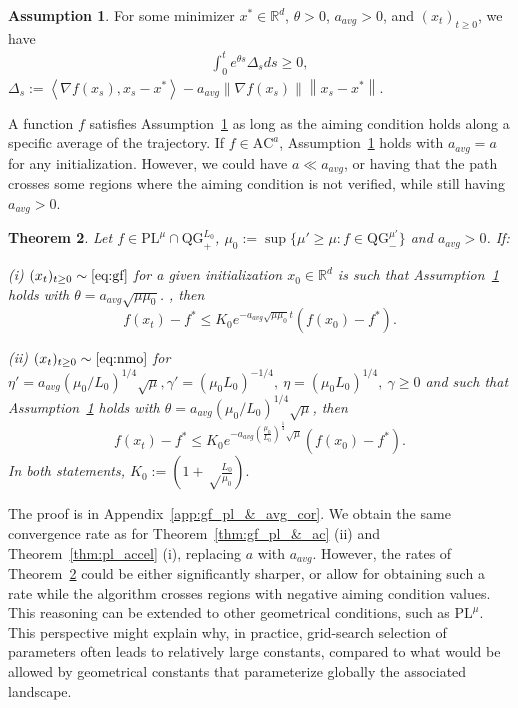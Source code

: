 \documentclass{article}
\newcommand{\jh}[1]{{\color{red} #1}}
\def\R{{\mathbb{R}}}
\def\xcont{(x_t)_{t\ge 0}}
\def\pl{{\text{PL}^\mu}}
\newcommand{\bpar}[1]{\left(#1\right)}
\newcommand{\norm}[1]{\left\lVert#1\right\rVert}
\newcommand{\dotprod}[1]{\left< #1\right>}
\newcommand{\ac}{\text{AC}^{a}}
\newcommand{\qg}{\text{QG}_{+}^{L_0}}
\newcommand{\qginff}[1]{\text{QG}_{-}^{#1}}
\theoremstyle{plain}
\newtheorem{theorem}{Theorem}[section]
\theoremstyle{definition}
\newtheorem{assumption}[theorem]{Assumption}
\theoremstyle{remark}
\begin{document}
\begin{assumption}\label{ass:avg_corelation}
    For some minimizer $x^\ast \in \R^d$, $\theta > 0$, $a_{avg} > 0$, and $\xcont$, we have
    \begin{align*}
        \int_0^t e^{\theta s}\Delta_sds
        \ge 0,
    \end{align*}
   $\Delta_s :=\dotprod{\nabla f(x_s),x_s-x^\ast}-a_{avg}\norm{\nabla f(x_s)}\norm{x_s-x^\ast}$.
\end{assumption}
A function $f$ satisfies Assumption~\ref{ass:avg_corelation} as long as the aiming condition holds along a specific average of the trajectory.
If $f \in \ac$, Assumption~\ref{ass:avg_corelation} holds with $a_{avg} = a$ for any %
initialization. However, we could have $a \ll a_{avg}$, or having that the path crosses some regions where the aiming condition is not verified, while still having $a_{avg} > 0$. %
\begin{theorem}\label{thm:gf_pl_&_avg_cor}
    Let $f \in \pl \cap \qg$, $\mu_0 := \sup\{\mu' \ge \mu: f \in \qginff{\mu'}\} $ and $a_{avg}>0$. If:
    
    (i) $\xcont \sim \eqref{eq:gf}$ for a given initialization $x_0 \in \R^d$ is such that Assumption~\ref{ass:avg_corelation} holds with $\theta = a_{avg}\sqrt{\mu \mu_0}$. , then
    $$ f(x_t)-f^\ast \le K_0e^{-a_{avg}\sqrt{\mu \mu_0}t}(f(x_0)-f^\ast). $$
    
    (ii) $\xcont \sim \eqref{eq:nmo}$ for $\eta' = a_{avg}\bpar{\mu_0/L_0}^{1/4}\sqrt{\mu}, \gamma' =  (\mu_0 L_0)^{-1/4},~\eta = (\mu_0 L_0)^{1/4}, ~ \gamma \ge 0$ and such that 
Assumption~\ref{ass:avg_corelation} holds with $\theta =  a_{avg}\bpar{\mu_0/L_0}^{1/4}\sqrt{\mu}$,  then
    $$f(x_t)-f^\ast \le K_0e^{- a_{avg}\bpar{\frac{\mu_0}{L_0}}^{\frac{1}{4}}\sqrt{\mu}} (f(x_0)-f^\ast).$$
    In both statements, $K_0 :=  \bpar{1+\sqrt\frac{L_0}{\mu_0}}.$
\end{theorem}
The proof is in Appendix~\ref{app:gf_pl_&_avg_cor}. We obtain the same convergence rate as for Theorem~\ref{thm:gf_pl_&_ac} (ii) and Theorem~\ref{thm:pl_accel} (i), replacing $a$ with $a_{avg}$. However, the rates of Theorem~\ref{thm:gf_pl_&_avg_cor} could be either significantly sharper, or allow for obtaining such a rate while the algorithm crosses regions with negative aiming condition values. This reasoning can be extended to other geometrical conditions, such as $\pl$. This perspective might explain why, in practice, grid-search selection of parameters often leads to relatively large constants, compared to what would be allowed by geometrical constants that parameterize globally the associated landscape.
\end{document}
